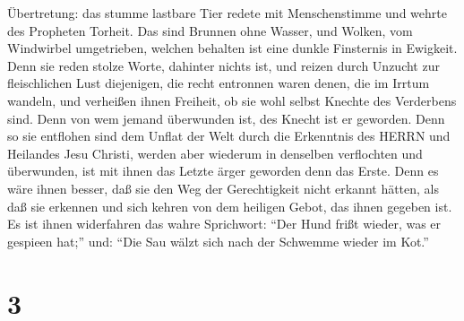 Übertretung: das stumme lastbare Tier redete mit Menschenstimme und
wehrte des Propheten Torheit.  Das sind Brunnen ohne
Wasser, und Wolken, vom Windwirbel umgetrieben, welchen behalten ist
eine dunkle Finsternis in Ewigkeit.  Denn sie reden stolze
Worte, dahinter nichts ist, und reizen durch Unzucht zur fleischlichen
Lust diejenigen, die recht entronnen waren denen, die im Irrtum wandeln,
 und verheißen ihnen Freiheit, ob sie wohl selbst Knechte
des Verderbens sind. Denn von wem jemand überwunden ist, des Knecht ist
er geworden.  Denn so sie entflohen sind dem Unflat der
Welt durch die Erkenntnis des HERRN und Heilandes Jesu Christi, werden
aber wiederum in denselben verflochten und überwunden, ist mit ihnen das
Letzte ärger geworden denn das Erste.  Denn es wäre ihnen
besser, daß sie den Weg der Gerechtigkeit nicht erkannt hätten, als daß
sie erkennen und sich kehren von dem heiligen Gebot, das ihnen gegeben
ist.  Es ist ihnen widerfahren das wahre Sprichwort: ``Der
Hund frißt wieder, was er gespieen hat;'' und: ``Die Sau wälzt sich nach
der Schwemme wieder im Kot.''

\hypertarget{section-2}{%
\section{3}\label{section-2}}

